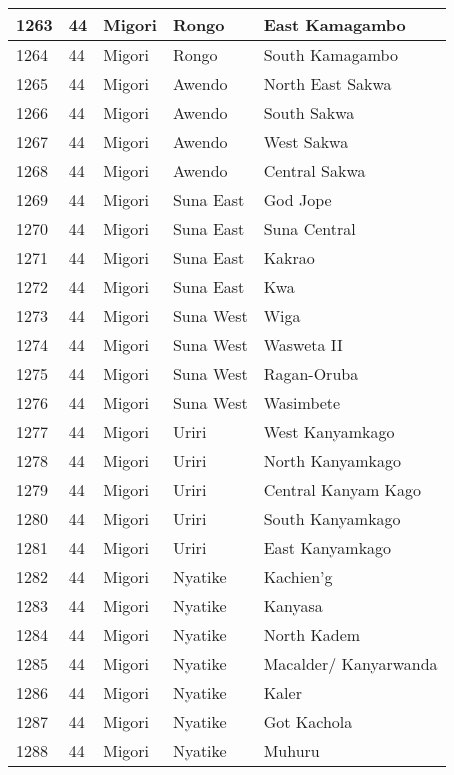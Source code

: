 \begin{table}[!ht]
\begin{tabular}{|l|l|l|l|l|}
        1263 & 44 & Migori & Rongo & East Kamagambo \\ \hline
        1264 & 44 & Migori & Rongo & South Kamagambo \\ \hline
        1265 & 44 & Migori & Awendo & North East Sakwa \\ \hline
        1266 & 44 & Migori & Awendo & South Sakwa \\ \hline
        1267 & 44 & Migori & Awendo & West Sakwa \\ \hline
        1268 & 44 & Migori & Awendo & Central Sakwa \\ \hline
        1269 & 44 & Migori & Suna East & God Jope \\ \hline
        1270 & 44 & Migori & Suna East & Suna Central \\ \hline
        1271 & 44 & Migori & Suna East & Kakrao \\ \hline
        1272 & 44 & Migori & Suna East & Kwa \\ \hline
        1273 & 44 & Migori & Suna West & Wiga \\ \hline
        1274 & 44 & Migori & Suna West & Wasweta II \\ \hline
        1275 & 44 & Migori & Suna West & Ragan-Oruba \\ \hline
        1276 & 44 & Migori & Suna West & Wasimbete \\ \hline
        1277 & 44 & Migori & Uriri & West Kanyamkago \\ \hline
        1278 & 44 & Migori & Uriri & North Kanyamkago \\ \hline
        1279 & 44 & Migori & Uriri & Central Kanyam Kago \\ \hline
        1280 & 44 & Migori & Uriri & South Kanyamkago \\ \hline
        1281 & 44 & Migori & Uriri & East Kanyamkago \\ \hline
        1282 & 44 & Migori & Nyatike & Kachien’g \\ \hline
        1283 & 44 & Migori & Nyatike & Kanyasa \\ \hline
        1284 & 44 & Migori & Nyatike & North Kadem \\ \hline
        1285 & 44 & Migori & Nyatike & Macalder/ Kanyarwanda \\ \hline
        1286 & 44 & Migori & Nyatike & Kaler \\ \hline
        1287 & 44 & Migori & Nyatike & Got Kachola \\ \hline
        1288 & 44 & Migori & Nyatike & Muhuru \\ \hline

\end{tabular}
\end{table}
